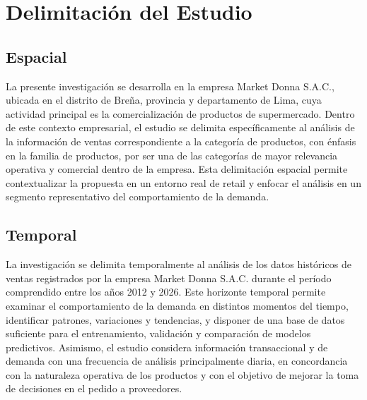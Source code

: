 \section{Delimitación del Estudio}

\subsection{Espacial}
La presente investigación se desarrolla en la empresa Market Donna S.A.C., ubicada en el distrito de Breña, provincia y departamento de Lima, cuya actividad principal es la comercialización de productos de supermercado. Dentro de este contexto empresarial, el estudio se delimita específicamente al análisis de la información de ventas correspondiente a la categoría de productos, con énfasis en la familia de productos, por ser una de las categorías de mayor relevancia operativa y comercial dentro de la empresa. Esta delimitación espacial permite contextualizar la propuesta en un entorno real de retail y enfocar el análisis en un segmento representativo del comportamiento de la demanda.


\subsection{Temporal}
La investigación se delimita temporalmente al análisis de los datos históricos de ventas registrados por la empresa Market Donna S.A.C. durante el período comprendido entre los años 2012 y 2026. Este horizonte temporal permite examinar el comportamiento de la demanda en distintos momentos del tiempo, identificar patrones, variaciones y tendencias, y disponer de una base de datos suficiente para el entrenamiento, validación y comparación de modelos predictivos. Asimismo, el estudio considera información transaccional y de demanda con una frecuencia de análisis principalmente diaria, en concordancia con la naturaleza operativa de los productos y con el objetivo de mejorar la toma de decisiones en el pedido a proveedores.


